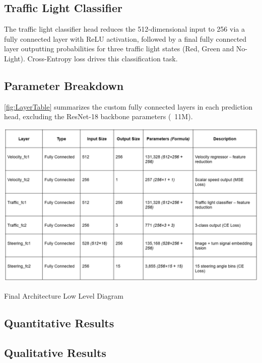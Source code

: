 \documentclass{article} %
\begin{document}
\subsection{Traffic Light Classifier}

The traffic light classifier head reduces the 512-dimensional input to 256 via a fully connected layer with ReLU activation, followed by a final fully connected layer outputting probabilities for three traffic light states (Red, Green and No-Light). 
Cross-Entropy loss drives this classification task.

\subsection{Parameter Breakdown}

\autoref{fig:LayerTable} summarizes the custom fully connected layers in each prediction head, excluding the ResNet-18 backbone parameters (~11M).

\begin{table}[H] %
    \centering
    \includegraphics[width=1.0\textwidth]{LayerTable.png} %
    \caption{Final Architecture Low Level Diagram}
    \label{fig:LayerTable}
\end{table}

\subsection{Quantitative Results}

\subsection{Qualitative Results}
\end{document}
